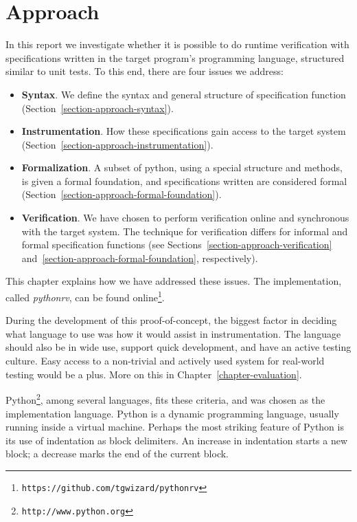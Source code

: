 
\pagestyle{newchap}
\chapter{Approach} \label{chapter-approach}
\lstset{language=Python}

In this report we investigate whether it is possible to do runtime verification
with specifications written in the target program's programming language,
structured similar to unit tests. To this end, there are four issues we
address:

\begin{itemize}
  \item \textbf{Syntax}. We define the syntax and general structure of
    specification function (Section~\ref{section-approach-syntax}).
  \item \textbf{Instrumentation}. How these specifications gain access to the
    target system (Section~\ref{section-approach-instrumentation}).
  \item \textbf{Formalization}. A subset of python, using a special structure
    and methods, is given a formal foundation, and specifications written are
    considered formal (Section~\ref{section-approach-formal-foundation}).
  \item \textbf{Verification}. We have chosen to perform verification online
    and synchronous with the target system. The technique for verification
    differs for informal and formal specification functions (see
    Sections~\ref{section-approach-verification}
    and~\ref{section-approach-formal-foundation}, respectively).
\end{itemize}

This chapter explains how we have addressed these issues. The implementation,
called \textit{pythonrv}, can be found
online\footnote{\texttt{https://github.com/tgwizard/pythonrv}}.

During the development of this proof-of-concept, the biggest factor in deciding
what language to use was how it would assist in instrumentation. The language
should also be in wide use, support quick development, and have an active
testing culture. Easy access to a non-trivial and actively used system for
real-world testing would be a plus. More on this in
Chapter~\ref{chapter-evaluation}.

Python\footnote{\texttt{http://www.python.org}}, among several languages, fits
these criteria, and was chosen as the implementation language. Python is a
dynamic programming language, usually running inside a virtual machine.
Perhaps the most striking feature of Python is its use of indentation as block
delimiters. An increase in indentation starts a new block; a decrease marks the
end of the current block.

